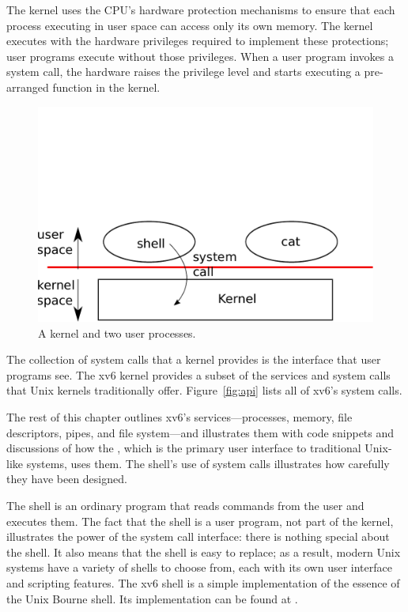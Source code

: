 The kernel uses the CPU's hardware protection mechanisms to
ensure that each process executing in user space can access only
its own memory.
The kernel executes with the hardware privileges required to
implement these protections; user programs execute without
those privileges.
When a user program invokes a system call, the hardware
raises the privilege level and starts executing a pre-arranged
function in the kernel.

\begin{figure}[t]
\center
\includegraphics[scale=0.5]{fig/os.pdf}
\caption{A kernel and two user processes.}
\label{fig:os}
\end{figure}

The collection of system calls that a kernel provides
is the interface that user programs see.
The xv6 kernel provides a subset of the services and system calls
that Unix kernels traditionally offer.  
Figure~\ref{fig:api} 
lists all of xv6's system calls.

The rest of this chapter outlines xv6's services---processes, memory,
file descriptors, pipes, and file system---and illustrates them with
code snippets and discussions of how the , which is
the primary user interface to traditional Unix-like systems, uses
them. The shell's use of system calls illustrates how carefully they
have been designed.

The shell is an ordinary program that reads commands from the user
and executes them.
The fact that the shell is a user program, not part of the kernel, 
illustrates the power of the system call interface: there is nothing
special about the shell.
It also means that the shell is easy to replace; as a result,
modern Unix systems have a variety of
shells to choose from, each with its own user interface
and scripting features.
The xv6 shell is a simple implementation of the essence of
the Unix Bourne shell.  Its implementation can be found at 
.

